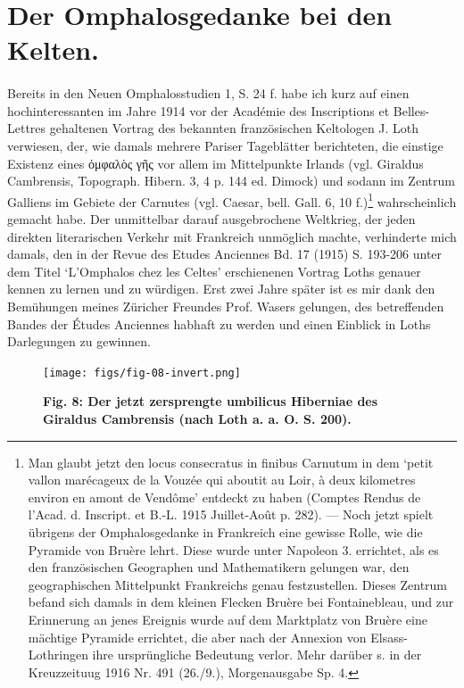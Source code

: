 \documentclass[a4paper, 11pt, oneside]{article}
\begin{document}
\section{Der Omphalosgedanke bei den Kelten.}
\paragraph{}
Bereits in den Neuen Omphalosstudien 1, S. 24 f. habe ich kurz auf einen hochinteressanten im Jahre 1914 vor der Académie des Inscriptions et Belles-Lettres gehaltenen Vortrag des bekannten französischen Keltologen J. Loth verwiesen, der, wie damals mehrere Pariser Tageblätter berichteten, die einstige Existenz eines ὀμφαλὸς γῆς vor allem im Mittelpunkte Irlands (vgl. Giraldus Cambrensis, Topograph. Hibern. 3, 4 p. 144 ed. Dimock) und sodann im Zentrum Galliens im Gebiete der Carnutes (vgl. Caesar, bell. Gall. 6, 10 f.)\footnote{Man glaubt jetzt den locus consecratus in finibus Carnutum in dem `petit vallon marécageux de la Vouzée qui aboutit au Loir, à deux kilometres environ en amont de Vendôme' entdeckt zu haben (Comptes Rendus de l'Acad. d. Inscript. et B.-L. 1915 Juillet-Août p. 282). --- Noch jetzt spielt übrigens der Omphalosgedanke in Frankreich eine gewisse Rolle, wie die Pyramide von Bruère lehrt. Diese wurde unter Napoleon 3. errichtet, als es den französischen Geographen und Mathematikern gelungen war, den geographischen Mittelpunkt Frankreichs genau festzustellen. Dieses Zentrum befand sich damals in dem kleinen Flecken Bruère bei Fontainebleau, und zur Erinnerung an jenes Ereignis wurde auf dem Marktplatz von Bruère eine mächtige Pyramide errichtet, die aber nach der Annexion von Elsass-Lothringen ihre ursprüngliche Bedeutung verlor. Mehr darüber s. in der Kreuzzeituug 1916 Nr. 491 (26./9.), Morgenausgabe Sp. 4.} wahrscheinlich gemacht habe. Der unmittelbar darauf ausgebrochene Weltkrieg, der jeden direkten literarischen Verkehr mit Frankreich unmöglich machte, verhinderte mich damals, den in der Revue des Etudes Anciennes Bd. 17 (1915) S. 193-206 unter dem Titel `L'Omphalos chez les Celtes' erschienenen Vortrag Loths genauer kennen zu lernen und zu würdigen. Erst zwei Jahre später ist es mir dank den Bemühungen meines Züricher Freundes Prof. Wasers gelungen, des betreffenden Bandes der Études Anciennes habhaft zu werden und einen Einblick in Loths Darlegungen zu gewinnen.

\begin{figure}[H]
\centering
\texttt{[image: figs/fig-08-invert.png]}
\caption{\bfseries Fig. 8: Der jetzt zersprengte umbilicus Hiberniae des Giraldus Cambrensis (nach Loth a. a. O. S. 200).}
\end{figure}
\end{document}
